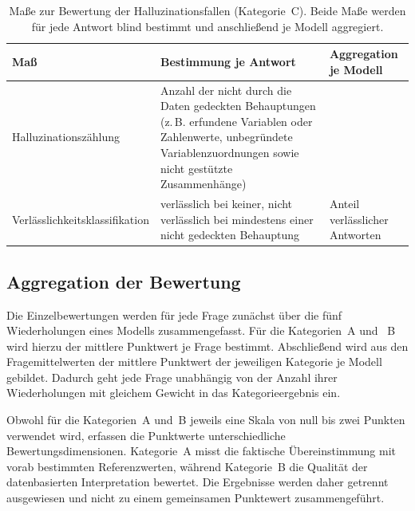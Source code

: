 \begin{table}[htbp]
    \centering
    \small
    \caption[Halluzinationsmaße für Kategorie C]%
    {Maße zur Bewertung der Halluzinationsfallen (Kategorie~C). Beide Maße werden
    für jede Antwort blind bestimmt und anschließend je Modell aggregiert.}
    \label{tab:hallu}
 
    \renewcommand{\arraystretch}{1.2}
    \begin{tabularx}{\textwidth}{
        >{\raggedright\arraybackslash}p{3.2cm}
        >{\raggedright\arraybackslash}X
        >{\raggedright\arraybackslash}X
    }
        \toprule
        \textbf{Maß} &
        \textbf{Bestimmung je Antwort} &
        \textbf{Aggregation je Modell} \\
        \midrule
 
        Halluzinations\-zählung &
        Anzahl der nicht durch die Daten gedeckten Behauptungen
        (z.\,B. erfundene Variablen oder Zahlenwerte, unbegründete
        Variablenzuordnungen sowie nicht gestützte Zusammenhänge) \\
   
        Verlässlichkeits\-klassifikation &
        verlässlich bei keiner, nicht verlässlich bei mindestens einer nicht gedeckten Behauptung &
        Anteil verlässlicher Antworten \\
 
        \bottomrule
    \end{tabularx}
\end{table}

\subsection{Aggregation der Bewertung}
\label{subsec:aggregation}

Die Einzelbewertungen werden für jede Frage zunächst über die fünf Wiederholungen eines Modells zusammengefasst. Für die Kategorien~A und ~B wird hierzu der mittlere Punktwert je Frage bestimmt. Abschließend wird aus den Fragemittelwerten der mittlere Punktwert der jeweiligen Kategorie je Modell gebildet. Dadurch geht jede Frage unabhängig von der Anzahl ihrer Wiederholungen mit gleichem Gewicht in das Kategorieergebnis ein.

Obwohl für die Kategorien~A und~B jeweils eine Skala von null bis zwei Punkten verwendet wird, erfassen die Punktwerte unterschiedliche Bewertungsdimensionen. Kategorie~A misst die faktische Übereinstimmung mit vorab bestimmten Referenzwerten, während Kategorie~B die Qualität der datenbasierten Interpretation bewertet. Die Ergebnisse werden daher getrennt ausgewiesen und nicht zu einem gemeinsamen Punktewert zusammengeführt.

